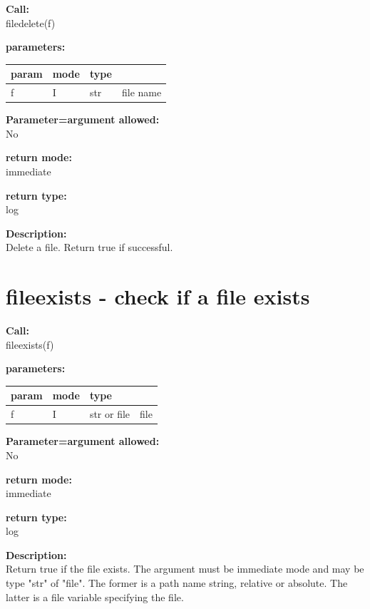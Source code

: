         {\bf Call:} \\
        filedelete(f)
        
        {\bf parameters:} \\
        \begin{tabular}{| l | l | l | l |}
        \hline
        param  & mode & type & \\
        \hline \hline
        f & I & str & file name \\ \hline
        \end{tabular}
        
        {\bf Parameter=argument allowed:} \\
        No
        
        {\bf return mode:} \\
        immediate

        {\bf return type:} \\
        log
        
        {\bf Description:} \\
        Delete a file. Return true if successful.
 


    \section{fileexists - check if a file exists}\label{sec:iffileexists}
        
        {\bf Call:} \\
        fileexists(f)
        
        {\bf parameters:} \\
        \begin{tabular}{| l | l | l | l |}
        \hline
        param  & mode & type & \\
        \hline \hline
        f & I & str or file & file \\ \hline
        \end{tabular}
        
        {\bf Parameter=argument allowed:} \\
        No
        
        {\bf return mode:} \\
        immediate

        {\bf return type:} \\
        log
        
        {\bf Description:} \\
        Return true if the file exists.
        The argument must be immediate mode and may be type "str"
        of "file". The former is a path name string, relative or absolute.
        The latter is a file variable specifying the file.
 


